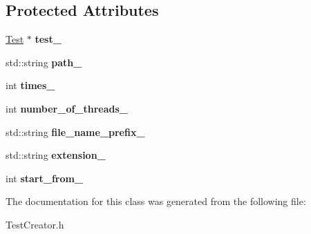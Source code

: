 \subsection*{Protected Attributes}
\begin{DoxyCompactItemize}
\item 
\mbox{\label{class_test_creator_a4f8fecd5a07c62d4f2fcdfe7139a5ccf}} 
\hyperlink{class_test}{Test} $\ast$ {\bfseries test\+\_\+}
\item 
\mbox{\label{class_test_creator_ab2ac1e5aa9682b89d2ffd2d4b9657e09}} 
std\+::string {\bfseries path\+\_\+}
\item 
\mbox{\label{class_test_creator_a9bbb73aa599bdd2455ea3acd6ae422ac}} 
int {\bfseries times\+\_\+}
\item 
\mbox{\label{class_test_creator_a4e56773a1a47da7d416e3258b0a9a11f}} 
int {\bfseries number\+\_\+of\+\_\+threads\+\_\+}
\item 
\mbox{\label{class_test_creator_ac1c7262d75e3b547efdd774514a4f8e3}} 
std\+::string {\bfseries file\+\_\+name\+\_\+prefix\+\_\+}
\item 
\mbox{\label{class_test_creator_a76c471dd1f4bdb04c1fd71c779f2cbab}} 
std\+::string {\bfseries extension\+\_\+}
\item 
\mbox{\label{class_test_creator_ac4db98afb823de08926f31b54218d736}} 
int {\bfseries start\+\_\+from\+\_\+}
\end{DoxyCompactItemize}


The documentation for this class was generated from the following file\+:\begin{DoxyCompactItemize}
\item 
Test\+Creator.\+h\end{DoxyCompactItemize}
